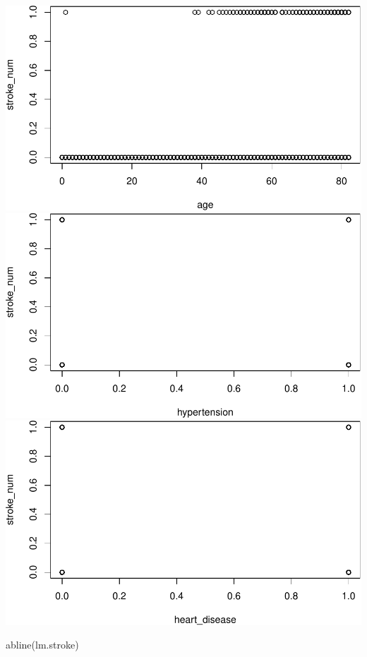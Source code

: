 \documentclass[
]{article}
\newenvironment{Shaded}{\begin{snugshade}}{\end{snugshade}}
\newcommand{\FunctionTok}[1]{\textcolor[rgb]{0.00,0.00,0.00}{#1}}
\newcommand{\NormalTok}[1]{#1}
\renewcommand{\=}[1]{\stackrel{#1}{=}}
\theoremstyle{definition}
\theoremstyle{remark}
\begin{document}
\includegraphics{sioux_mach_learn_project_files/figure-latex/unnamed-chunk-30-1.pdf} \includegraphics{sioux_mach_learn_project_files/figure-latex/unnamed-chunk-30-2.pdf} \includegraphics{sioux_mach_learn_project_files/figure-latex/unnamed-chunk-30-3.pdf}

\begin{Shaded}
\begin{Highlighting}[]
\FunctionTok{abline}\NormalTok{(lm.stroke)}
\end{Highlighting}
\end{Shaded}
\end{document}
